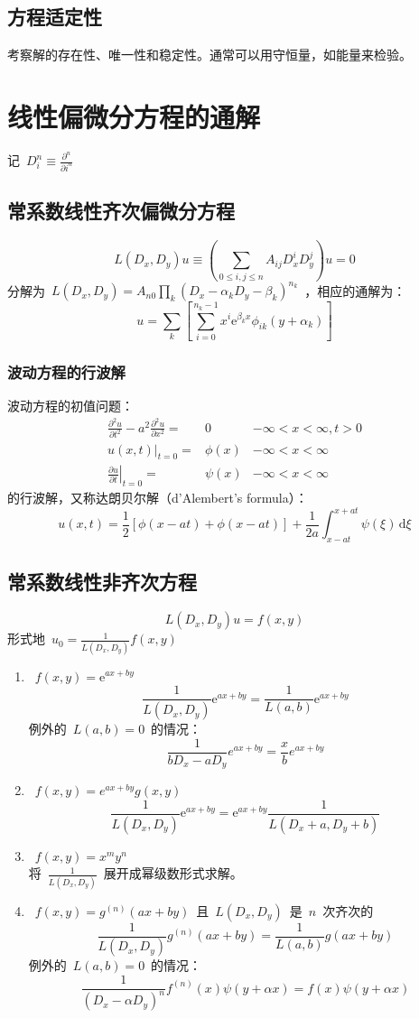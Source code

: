 \documentclass[12pt,a4paper]{article}
\newcommand\diff{\,\mathrm{d}}
\renewcommand{\[}{\ $\displaystyle}
\renewcommand{\]}{$\ }%
\newcommand{\pard}[2]{\ensuremath{\frac{\partial #1}{\partial #2}}}
\newcommand{\pardsq}[2]{\ensuremath{\frac{\partial^2 #1}{\partial #2^2}}}
\newcommand\e{\mathrm{e}}
\begin{document}
  \subsection{方程适定性}
  考察解的存在性、唯一性和稳定性。通常可以用守恒量，如能量来检验。
  
\section{线性偏微分方程的通解}
  记\[D_i^n \equiv \frac{\partial^n}{\partial i^n}\]
   \subsection{常系数线性齐次偏微分方程}
     $$
       L(D_x,D_y)u \equiv \left(\sum_{0\le i,j\le n} A_{ij} D_x^iD_y^j\right)u = 0
     $$
     分解为\[L(D_x,D_y) = A_{n0}\prod_k(D_x - \alpha_k D_y - \beta_k)^{n_k}\]，相应的通解为：
     $$
       u = \sum_k \left[\sum_{i=0}^{n_k-1}x^i\e^{\beta_k x}\phi_{ik}(y+\alpha_k)\right]
     $$
    \subsubsection{波动方程的行波解}
    波动方程的初值问题：
    \begin{eqnarray*}
     \pardsq{u}{t} - a^2\pardsq{u}{x} =& 0 &-\infty < x < \infty ,t>0\\
     \left. u(x,t)\right|_{t=0} = &\phi(x) &-\infty < x < \infty \\
     \left. \pard{u}{t} \right|_{t=0} = &\psi(x) &-\infty < x < \infty
    \end{eqnarray*}
     的行波解，又称达朗贝尔解（d'Alembert's formula）：
     $$
       u(x,t) = \frac 12[\phi(x-at)+\phi(x-at)] + \frac 1{2a}\int_{x-at}^{x+at} \psi(\xi)\diff \xi
     $$
   \subsection{常系数线性非齐次方程}
    $$
      L(D_x,D_y)u = f(x,y)
    $$
    形式地\[u_0 = \frac{1}{L(D_x,D_y)}f(x,y)\]
    \begin{enumerate}
     \item \[f(x,y) = \e^{ax+by}\]
     	$$
     	  \frac{1}{L(D_x,D_y)}\e^{ax+by} = \frac{1}{L(a,b)}\e^{ax+by}
     	$$
     	例外的\[L(a,b) = 0\]的情况：
     	$$
     	  \frac{1}{bD_x - aD_y}e^{ax+by} = \frac{x}{b}e^{ax+by}
     	$$
     \item \[f(x,y) = e^{ax+by}g(x,y)\]
     	$$
     	  \frac{1}{L(D_x,D_y)}\e^{ax+by} = \e^{ax+by}\frac{1}{L(D_x + a,D_y + b)}
     	$$
     \item \[f(x,y) = x^my^n\]\\
     	将\[\frac{1}{L(D_x,D_y)}\]展开成幂级数形式求解。
     \item \[f(x,y) = g^{(n)}(ax+by)\]且\[L(D_x,D_y)\]是\[n\]次齐次的
     	$$
     	  \frac{1}{L(D_x,D_y)}g^{(n)}(ax+by) = \frac{1}{L(a,b)}g(ax+by)
     	$$
     	例外的\[L(a,b) = 0\]的情况：
     	$$
     	  \frac{1}{(D_x - \alpha D_y)^n}f^{(n)}(x)\psi(y + \alpha x) = f(x)\psi(y + \alpha x)
     	$$
     \end{enumerate}
\end{document}
